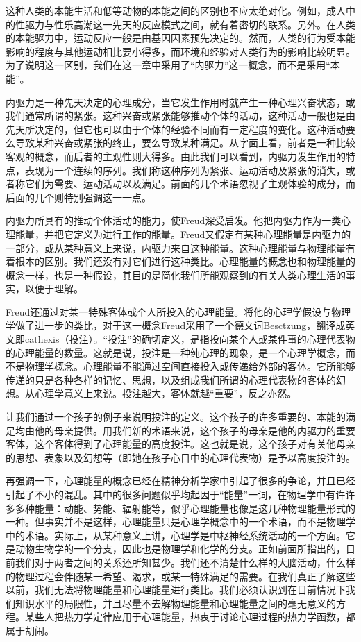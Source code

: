 \documentclass[UTF8,10pt,a4paper,openany]{book}
\begin{document}
这种人类的本能生活和低等动物的本能之间的区别也不应太绝对化。例如，成人中的性驱力与性乐高潮这一先天的反应模式之间，就有着密切的联系。另外。在人类的本能驱力中，运动反应一般是由基因因素预先决定的。然而，人类的行为受本能影响的程度与其他运动相比要小得多，而环境和经验对人类行为的影响比较明显。为了说明这一区别，我们在这一章中采用了“内驱力”这一概念，而不是采用“本能”。

内驱力是一种先天决定的心理成分，当它发生作用时就产生一种心理兴奋状态，或我们通常所谓的紧张。这种兴奋或紧张能够推动个体的活动，这种活动一般也是由先天所决定的，但它也可以由于个体的经验不同而有一定程度的变化。这种活动要么导致某种兴奋或紧张的终止，要么导致某种满足。从字面上看，前者是一种比较客观的概念，而后者的主观性则大得多。由此我们可以看到，内驱力发生作用的特点，表现为一个连续的序列。我们称这种序列为紧张、运动活动及紧张的消失，或者称它们为需要、运动活动以及满足。前面的几个术语忽视了主观体验的成分，而后面的几个则特别强调这一一点。

内驱力所具有的推动个体活动的能力，使Freud深受启发。他把内驱力作为一类心理能量，并把它定义为进行工作的能量。Freud又假定有某种心理能量是内驱力的一部分，或从某种意义上来说，内驱力来自这种能量。这种心理能量与物理能量有着根本的区别。我们还没有对它们进行这种类比。心理能量的概念也和物理能量的概念一样，也是一种假设，其目的是简化我们所能观察到的有关人类心理生活的事实，以便于理解。

Freud还通过对某一特殊客体或个人所投入的心理能量。将他的心理学假设与物理学做了进一步的类比，对于这一概念Freud采用了一个德文词Besctzung，翻译成英文即cathexis（投注）。“投注”的确切定义，是指投向某个人或某件事的心理代表物的心理能量的数量。这就是说，投注是一种纯心理的现象，是一个心理学概念，而不是物理学概念。心理能量不能通过空间直接投入或传递给外部的客体。它所能够传递的只是各种各样的记忆、思想，以及组成我们所谓的心理代表物的客体的幻想。从心理学意义上来说。投注越大，客体就越“重要”，反之亦然。

让我们通过一个孩子的例子来说明投注的定义。这个孩子的许多重要的、本能的满足均由他的母亲提供。用我们新的术语来说，这个孩子的母亲是他的内驱力的重要客体，这个客体得到了心理能量的高度投注。这也就是说，这个孩子对有关他母亲的思想、表象以及幻想等（即她在孩子心目中的心理代表物）是予以高度投注的。

再强调一下，心理能量的概念已经在精神分析学家中引起了很多的争论，并且已经引起了不小的混乱。其中的很多问题似乎均起因于“能量”一词，在物理学中有许许多多种能量：动能、势能、辐射能等，似乎心理能量也像是这几种物理能量形式的一种。但事实并不是这样，心理能量只是心理学概念中的一个术语，而不是物理学中的术语。实际上，从某种意义上讲，心理学是中枢神经系统活动的一个方面。它是动物生物学的一个分支，因此也是物理学和化学的分支。正如前面所指出的，目前我们对于两者之间的关系还所知甚少。我们还不清楚什么样的大脑活动，什么样的物理过程会伴随某一希望、渴求，或某一特殊满足的需要。在我们真正了解这些以前，我们无法将物理能量和心理能量进行类比。我们必须认识到在目前情况下我们知识水平的局限性，并且尽量不去解物理能量和心理能量之间的毫无意义的方程。某些人把热力学定律应用于心理能量，热衷于讨论心理过程的热力学函数，都属于胡闹。
\end{document}

